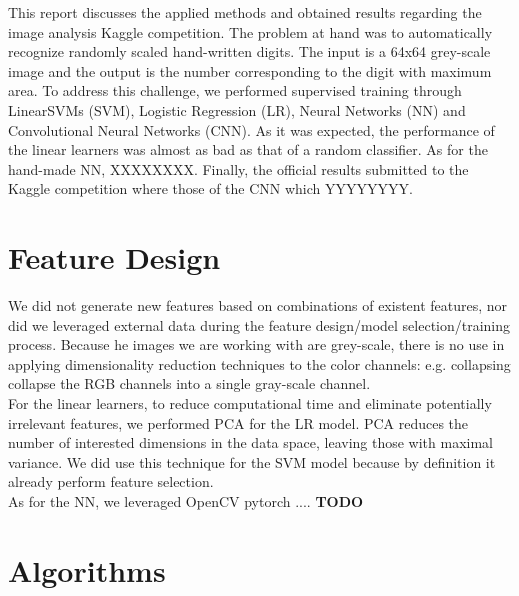 \documentclass[10pt, hidelinks]{article}
\begin{document}
This report discusses the applied methods and obtained results regarding the image analysis Kaggle competition. The problem at hand was to automatically recognize randomly scaled hand-written digits. The input is a 64x64 grey-scale image and the output is the number corresponding to the digit with maximum area. To address this challenge, we performed supervised training through LinearSVMs (SVM), Logistic Regression (LR), Neural Networks (NN) and Convolutional Neural Networks (CNN). As it was expected, the performance of the linear learners was almost as bad as that of a random classifier. As for the hand-made NN, XXXXXXXX. Finally, the official results submitted to the Kaggle competition where those of the CNN which YYYYYYYY.

\section*{Feature Design}

We did not generate new features based on combinations of existent features, nor did we leveraged external data during the feature design/model selection/training process. Because he images we are working with are grey-scale, there is no use in applying dimensionality reduction techniques to the color channels: e.g. collapsing collapse the RGB channels into a single gray-scale channel.\\
\noindent For the linear learners, to reduce computational time and eliminate potentially irrelevant features, we performed PCA for the LR model. PCA reduces the number of interested dimensions in the data space, leaving those with maximal variance. We did use this technique for the SVM model because by definition it already perform feature selection.\\
\noindent As for the NN, we leveraged OpenCV pytorch  .... \textbf{TODO}

\section*{Algorithms}
\end{document}
